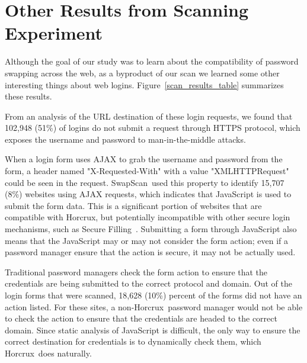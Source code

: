 \documentclass[sigconf, anonymous]{acmart}
\newcommand*\SecPass{Horcrux}
\newcommand*\SwapScan{SwapScan}
\begin{document}
\section{Other Results from Scanning Experiment}\label{extracting_other_information}

Although the goal of our study was to learn about the compatibility of password swapping across the web, as a byproduct of our scan we learned some other interesting things about web logins. Figure~\ref{scan_results_table} summarizes these results.

From an analysis of the URL destination of these login requests, we found that 102,948 (51\%) of logins do not submit a request through HTTPS protocol, which exposes the username and password to man-in-the-middle attacks. 

When a login form uses AJAX to grab the username and password from the form, a header named "X-Requested-With" with a value "XMLHTTPRequest" could be seen in the request.  \SwapScan\ used this property to identify 15,707
 (8\%) websites using AJAX requests, which indicates that JavaScript is used to submit the form data. This is a significant portion of websites that are compatible with \SecPass, but potentially incompatible with other secure login mechanisms, such as Secure Filling~\cite{Silver2014}. Submitting a form through JavaScript also means that the JavaScript may or may not consider the form action; even if a password manager ensure that the action is secure, it may not be actually used. 

Traditional password managers check the form action to ensure that the credentials are being submitted to the correct protocol and domain. Out of the login forms that were scanned, 18,628 (10\%) percent of the forms did not have an action listed. For these sites, a non-\SecPass\ password manager would not be able to check the action to ensure that the credentials are headed to the correct domain. Since static analysis of JavaScript is difficult, the only way to ensure the correct destination for credentials is to dynamically check them, which \SecPass\ does naturally.
\end{document}
